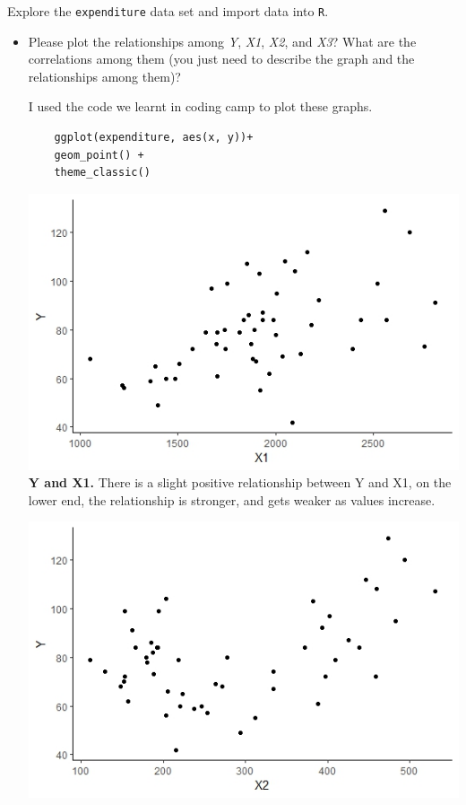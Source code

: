 \documentclass[12pt,letterpaper]{article}
\begin{document}
\vspace{.5cm}
\noindent Explore the \texttt{expenditure} data set and import data into \texttt{R}.
\vspace{.5cm}
\begin{itemize}

\item
Please plot the relationships among \emph{Y}, \emph{X1}, \emph{X2}, and \emph{X3}? What are the correlations among them (you just need to describe the graph and the relationships among them)?

I used the code we learnt in coding camp to plot these graphs.
\begin{verbatim}
	ggplot(expenditure, aes(x, y))+
	geom_point() +
	theme_classic()
\end{verbatim}


\includegraphics{YandX1}
\\
\textbf{Y and X1.} There is a slight positive relationship between Y and X1, on the lower end, the relationship is stronger, and gets weaker as values increase.
\vspace{.5cm}
\newpage

\includegraphics{YandX2}


\end{itemize}
\end{document}
